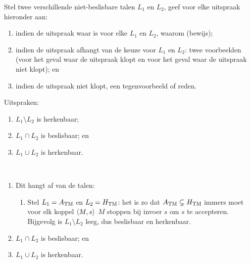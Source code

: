 \documentclass{article}
\begin{document}
\begin{question}
Stel twee verschillende niet-beslisbare talen $L_1$ en $L_2$, geef voor elke uitspraak hieronder aan:
\begin{enumerate}
 \item indien de uitspraak waar is voor elke $L_1$ en $L_2$, waarom (bewijs);
 \item indien de uitspraak afhangt van de keuze voor $L_1$ en $L_2$: twee voorbeelden (voor het geval waar de uitspraak klopt en voor het geval waar de uitspraak niet klopt); en
 \item indien de uitspraak niet klopt, een tegenvoorbeeld of reden.
\end{enumerate}
Uitspraken:
\begin{enumerate}
 \item $L_1\setminus L_2$ is herkenbaar;
 \item $L_1\cap L_2$ is beslisbaar; en
 \item $L_1\cup L_2$ is herkenbaar.
\end{enumerate}
\begin{answer}~~
\begin{enumerate}
 \item Dit hangt af van de talen:
 \begin{enumerate}
  \item Stel $L_1=A_{\rm TM}$ en $L_2=H_{\rm TM}$: het is zo dat $A_{\rm TM}\subsetneq H_{\rm TM}$ immers moet voor elk koppel $\left\langle M,s \right\rangle$ $M$ stoppen bij invoer $s$ om $s$ te accepteren. Bijgevolg is $L_1\setminus L_2$ leeg, dus beslisbaar en herkenbaar.
 \end{enumerate}
 \item $L_1\cap L_2$ is beslisbaar; en
 \item $L_1\cup L_2$ is herkenbaar.
\end{enumerate}
\end{answer}
\end{question}
\end{document}
